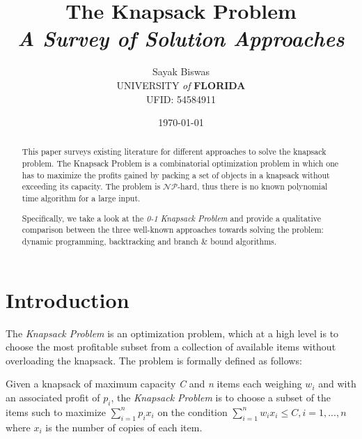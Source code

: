 \documentclass{article}
\title{The Knapsack Problem \\ \small \textit{A Survey of Solution Approaches}}
\date{\small \today}
\author{Sayak Biswas \\ \small UNIVERSITY \textit{of} \textbf{FLORIDA} \\ \small UFID: 54584911}
\begin{document}
\maketitle
\begin{abstract}
This paper surveys existing literature for different approaches to solve the knapsack problem. The Knapsack Problem is a combinatorial optimization problem in which one has to maximize the profits gained by packing a set of objects in a knapsack without exceeding its capacity. The problem is $\mathcal{NP}$-hard, thus there is no known polynomial time algorithm for a large input.

Specifically, we take a look at the \textit{0-1 Knapsack Problem} and provide a qualitative comparison between the three well-known approaches towards solving the problem: dynamic programming, backtracking and branch \& bound algorithms.
\end{abstract}
\newpage


\section{Introduction}
The \textit{Knapsack Problem} is an optimization problem, which at a high level is to choose the most profitable subset from a collection of available items without overloading the knapsack. The problem is formally defined as follows:

Given a knapsack of maximum capacity \textit{C} and \textit{n} items each weighing \textit{$w_{i}$} and with an associated profit of \textit{$p_{i}$}, the \textit{Knapsack Problem} is to choose a subset of the items such to maximize $\sum\limits_{i=1}^{n}\textit{$p_{i}x_{i}$}$ on the condition $\sum\limits_{i=1}^{n}\textit{$w_{i}x_{i}$} \leq \textit{C}, \textit{i} = 1,...,\textit{n}$ where \textit{$x_{i}$} is the number of copies of each item.

\iffalse
The \textit{fractional} knapsack problem allows placing a fraction \textit{$x_{i}$} of object \textit{i} into the knapsack \textit{i.e.} $0 \le \textit{$x_{i}$} \le 1$.

The \textit{bounded} knapsack problem restricts each item type to an integer amount of copies \textit{i.e.} \textit{$x_{i}$} $\in \{0,...,m_{i}\}$

The \textit{unbounded} knapsack problem removes any restriction from the number of copies of each object type \textit{i.e.} \textit{$x_{i}$} $\ge$ 0.
\fi
\end{document}
